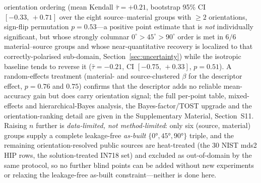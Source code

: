 \documentclass[12pt,a4paper,twocolumn]{article}
\begin{document}
orientation ordering (mean Kendall $\bar\tau = +0.21$, bootstrap 95\% CI $[-0.33,\,+0.71]$ over the eight source--material groups with $\ge2$ orientations, sign-flip permutation $p = 0.53$---a positive point estimate that is \emph{not} individually significant, but whose strongly columnar $0^\circ\!>\!45^\circ\!>\!90^\circ$ order is met in $6/6$ material--source groups and whose near-quantitative recovery is localized to that correctly-polarised sub-domain, Section~\ref{sec:uncertainty}) while the isotropic baseline tends to reverse it ($\bar\tau = -0.21$, CI $[-0.75,\,+0.33]$, $p = 0.51$). A random-effects treatment (material- and source-clustered $\beta$ for the descriptor effect, $p = 0.76$ and $0.75$) confirms that the descriptor adds no reliable mean-accuracy gain but does carry orientation signal; the full per-point table, mixed-effects and hierarchical-Bayes analysis, the Bayes-factor/TOST upgrade and the orientation-ranking detail are given in the Supplementary Material, Section~S11. Raising $n$ further is \emph{data-limited, not method-limited}: only six (source, material) groups supply a complete leakage-free \emph{as-built} $\{\ang{0},\ang{45},\ang{90}\}$ triple, and the remaining orientation-resolved public sources are heat-treated (the 30 NIST mds2 HIP rows, the solution-treated IN718 set) and excluded as out-of-domain by the same protocol, so no further blind points can be added without new experiments or relaxing the leakage-free as-built constraint---neither is done here.
\end{document}
